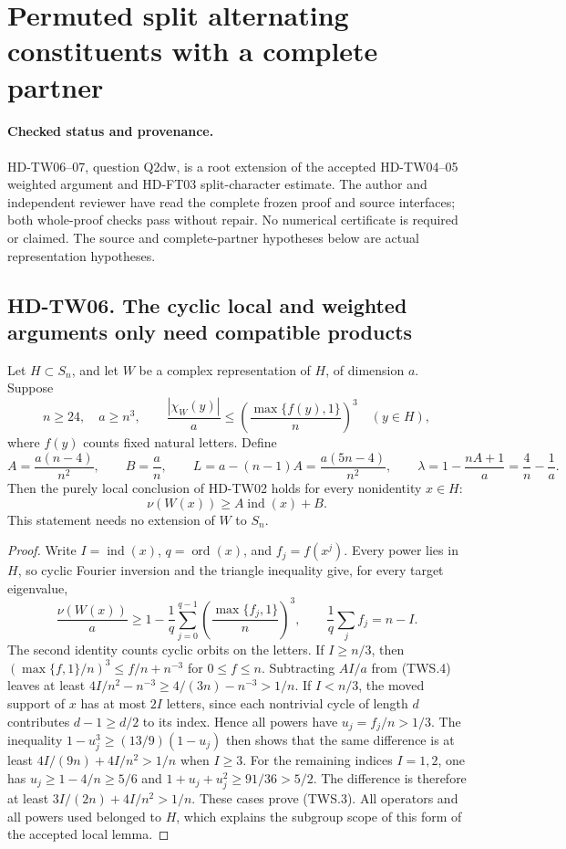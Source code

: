 \section{Permuted split alternating constituents with a complete partner}
\label{sec:permuted-split-partner}

\paragraph{Checked status and provenance.}
HD-TW06--07, question Q2dw, is a root extension of the accepted
HD-TW04--05 weighted argument and HD-FT03 split-character estimate.
The author and independent reviewer have read the complete frozen proof and source interfaces; both whole-proof checks pass without repair. No numerical
certificate is required or claimed. The source and complete-partner
hypotheses below are actual representation hypotheses.

\subsection*{HD-TW06. The cyclic local and weighted arguments only need compatible products}

Let \(H\subset S_n\), and let \(W\) be a complex representation of
\(H\), of dimension \(a\). Suppose
\[
 n\ge24,\quad a\ge n^3,\qquad
 \frac{|\chi_W(y)|}{a}\le
       \left(\frac{\max\{f(y),1\}}n\right)^3
       \quad(y\in H),
 \tag{TWS.1}
\]
where \(f(y)\) counts fixed natural letters. Define
\[
 A=\frac{a(n-4)}{n^2},\qquad B=\frac an,
 \qquad L=a-(n-1)A=\frac{a(5n-4)}{n^2},
 \qquad \lambda=1-\frac{nA+1}{a}=\frac4n-\frac1a.
 \tag{TWS.2}
\]
Then the purely local conclusion of HD-TW02 holds for every
nonidentity \(x\in H\):
\[
                 \nu(W(x))\ge A\operatorname{ind}(x)+B.
                 \tag{TWS.3}
\]
This statement needs no extension of \(W\) to \(S_n\).

\begin{proof}
Write \(I=\operatorname{ind}(x)\), \(q=\operatorname{ord}(x)\),
and \(f_j=f(x^j)\). Every power lies in \(H\), so cyclic Fourier
inversion and the triangle inequality give, for every target eigenvalue,
\[
 \frac{\nu(W(x))}{a}\ge
  1-\frac1q\sum_{j=0}^{q-1}
        \left(\frac{\max\{f_j,1\}}n\right)^3,
 \qquad \frac1q\sum_jf_j=n-I.
 \tag{TWS.4}
\]
The second identity counts cyclic orbits on the letters. If
\(I\ge n/3\), then
\((\max\{f,1\}/n)^3\le f/n+n^{-3}\) for \(0\le f\le n\).
Subtracting \(AI/a\) from (TWS.4) leaves at least
\(4I/n^2-n^{-3}\ge4/(3n)-n^{-3}>1/n\).
If \(I<n/3\), the moved support of \(x\) has at most \(2I\)
letters, since each nontrivial cycle of length \(d\) contributes
\(d-1\ge d/2\) to its index. Hence all powers have
\(u_j=f_j/n>1/3\). The inequality
\(1-u_j^3\ge(13/9)(1-u_j)\) then shows that the same difference
is at least \(4I/(9n)+4I/n^2>1/n\) when \(I\ge3\).
For the remaining indices \(I=1,2\), one has
\(u_j\ge1-4/n\ge5/6\) and
\(1+u_j+u_j^2\ge91/36>5/2\). The difference is therefore at
least \(3I/(2n)+4I/n^2>1/n\). These cases prove (TWS.3).
All operators and all powers used belonged to \(H\), which explains
the subgroup scope of this form of the accepted local lemma.
\end{proof}

